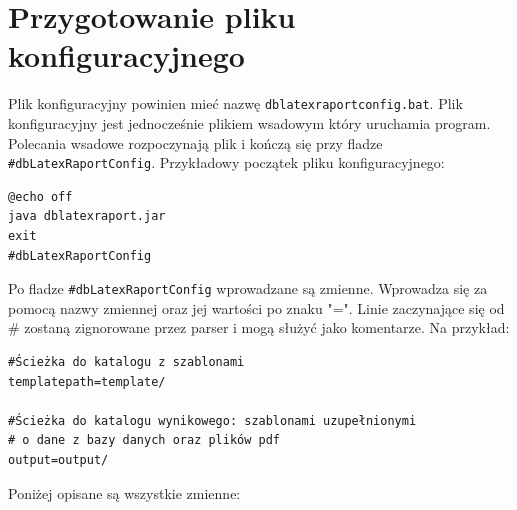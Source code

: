 \section{Przygotowanie pliku konfiguracyjnego}
Plik konfiguracyjny powinien mieć nazwę \texttt{dblatexraportconfig.bat}. Plik konfiguracyjny jest jednocześnie plikiem wsadowym który uruchamia program. Polecania wsadowe rozpoczynają plik i kończą się przy fladze \texttt{\#dbLatexRaportConfig}. Przykładowy początek pliku konfiguracyjnego:
\begin{lstlisting}
@echo off
java dblatexraport.jar
exit
#dbLatexRaportConfig
\end{lstlisting}
Po fladze \texttt{\#dbLatexRaportConfig} wprowadzane są zmienne. Wprowadza się  za pomocą nazwy zmiennej oraz jej wartości po znaku "=". Linie zaczynające się od \# zostaną zignorowane przez parser i mogą służyć jako komentarze. Na przykład:
\begin{lstlisting}
#Ścieżka do katalogu z szablonami
templatepath=template/

#Ścieżka do katalogu wynikowego: szablonami uzupełnionymi
# o dane z bazy danych oraz plików pdf
output=output/
\end{lstlisting}
Poniżej opisane są wszystkie zmienne:\vspace{5mm}
